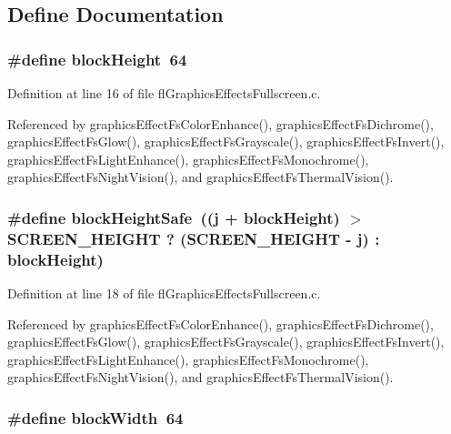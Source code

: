 \subsection{Define Documentation}
\subsubsection{\setlength{\rightskip}{0pt plus 5cm}\#define block\-Height~64}\label{flGraphicsEffectsFullscreen_8c_69e35aeb7f2ba44bf1fee616826e767c}




Definition at line 16 of file fl\-Graphics\-Effects\-Fullscreen.c.

Referenced by graphics\-Effect\-Fs\-Color\-Enhance(), graphics\-Effect\-Fs\-Dichrome(), graphics\-Effect\-Fs\-Glow(), graphics\-Effect\-Fs\-Grayscale(), graphics\-Effect\-Fs\-Invert(), graphics\-Effect\-Fs\-Light\-Enhance(), graphics\-Effect\-Fs\-Monochrome(), graphics\-Effect\-Fs\-Night\-Vision(), and graphics\-Effect\-Fs\-Thermal\-Vision().
\subsubsection{\setlength{\rightskip}{0pt plus 5cm}\#define block\-Height\-Safe~((j + block\-Height) $>$ SCREEN\_\-HEIGHT ? (SCREEN\_\-HEIGHT - j) : block\-Height)}\label{flGraphicsEffectsFullscreen_8c_dff8ca80628d3e5ba4970f0d8bf1c0a0}




Definition at line 18 of file fl\-Graphics\-Effects\-Fullscreen.c.

Referenced by graphics\-Effect\-Fs\-Color\-Enhance(), graphics\-Effect\-Fs\-Dichrome(), graphics\-Effect\-Fs\-Glow(), graphics\-Effect\-Fs\-Grayscale(), graphics\-Effect\-Fs\-Invert(), graphics\-Effect\-Fs\-Light\-Enhance(), graphics\-Effect\-Fs\-Monochrome(), graphics\-Effect\-Fs\-Night\-Vision(), and graphics\-Effect\-Fs\-Thermal\-Vision().
\subsubsection{\setlength{\rightskip}{0pt plus 5cm}\#define block\-Width~64}\label{flGraphicsEffectsFullscreen_8c_d31d6b74d07a31e371f1cab76d8f8e14}




